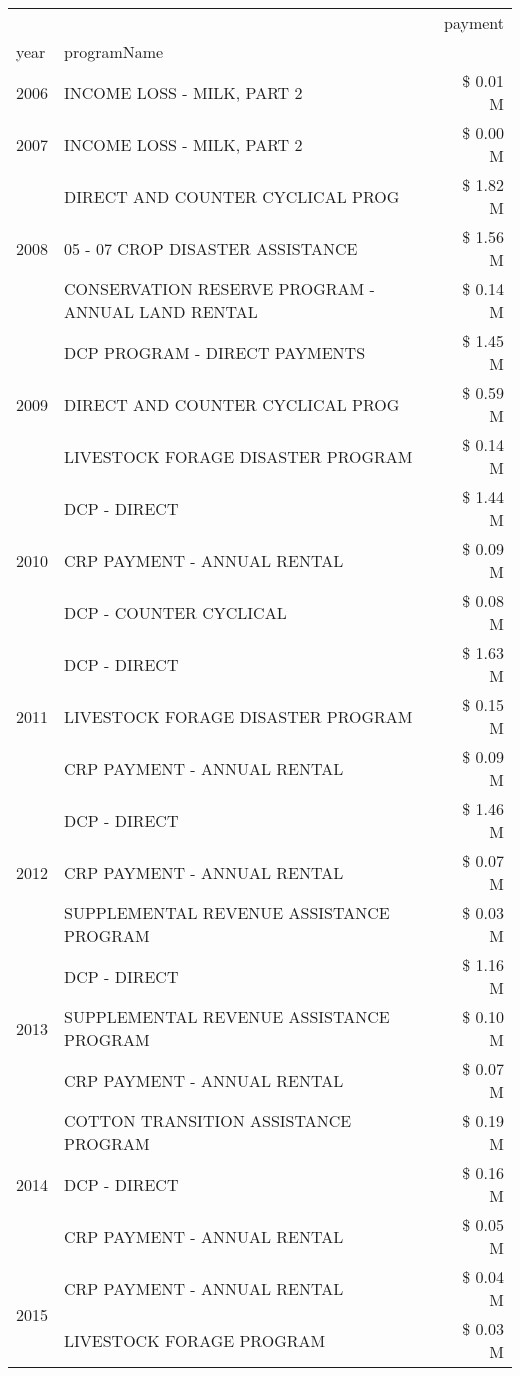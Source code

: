\begin{tabular}{llr}
\toprule
 &  & payment \\
year & programName &  \\
\midrule
2006 & INCOME LOSS - MILK, PART 2 & \$ 0.01 M \\
\cline{1-3}
2007 & INCOME LOSS - MILK, PART 2 & \$ 0.00 M \\
\cline{1-3}
\multirow[t]{3}{*}{2008} & DIRECT AND COUNTER CYCLICAL PROG & \$ 1.82 M \\
 & 05 - 07 CROP DISASTER ASSISTANCE & \$ 1.56 M \\
 & CONSERVATION RESERVE PROGRAM - ANNUAL LAND RENTAL & \$ 0.14 M \\
\cline{1-3}
\multirow[t]{3}{*}{2009} & DCP PROGRAM - DIRECT PAYMENTS & \$ 1.45 M \\
 & DIRECT AND COUNTER CYCLICAL PROG & \$ 0.59 M \\
 & LIVESTOCK FORAGE DISASTER  PROGRAM & \$ 0.14 M \\
\cline{1-3}
\multirow[t]{3}{*}{2010} & DCP - DIRECT & \$ 1.44 M \\
 & CRP PAYMENT - ANNUAL RENTAL & \$ 0.09 M \\
 & DCP - COUNTER CYCLICAL & \$ 0.08 M \\
\cline{1-3}
\multirow[t]{3}{*}{2011} & DCP - DIRECT & \$ 1.63 M \\
 & LIVESTOCK FORAGE DISASTER PROGRAM & \$ 0.15 M \\
 & CRP PAYMENT - ANNUAL RENTAL & \$ 0.09 M \\
\cline{1-3}
\multirow[t]{3}{*}{2012} & DCP - DIRECT & \$ 1.46 M \\
 & CRP PAYMENT - ANNUAL RENTAL & \$ 0.07 M \\
 & SUPPLEMENTAL REVENUE ASSISTANCE PROGRAM & \$ 0.03 M \\
\cline{1-3}
\multirow[t]{3}{*}{2013} & DCP - DIRECT & \$ 1.16 M \\
 & SUPPLEMENTAL REVENUE ASSISTANCE PROGRAM & \$ 0.10 M \\
 & CRP PAYMENT - ANNUAL RENTAL & \$ 0.07 M \\
\cline{1-3}
\multirow[t]{3}{*}{2014} & COTTON TRANSITION ASSISTANCE PROGRAM & \$ 0.19 M \\
 & DCP - DIRECT & \$ 0.16 M \\
 & CRP PAYMENT - ANNUAL RENTAL & \$ 0.05 M \\
\cline{1-3}
\multirow[t]{3}{*}{2015} & CRP PAYMENT - ANNUAL RENTAL & \$ 0.04 M \\
 & LIVESTOCK FORAGE PROGRAM & \$ 0.03 M \\

\end{tabular}
